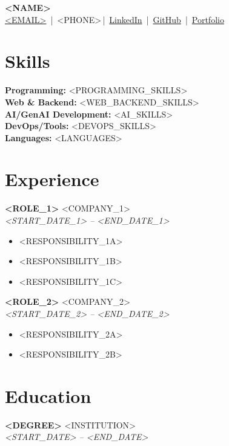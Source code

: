 \documentclass[a4paper,10pt]{article}
\newcommand{\Name}{<NAME>}
\newcommand{\Email}{<EMAIL>}
\newcommand{\Phone}{<PHONE>}
\newcommand{\LinkedIn}{<LINKEDIN>}
\newcommand{\GitHub}{<GITHUB>}
\newcommand{\Portfolio}{<PORTFOLIO>}
\begin{document}
\begin{center}
    {\LARGE \textbf{\Name}} \\
    \vspace{3pt}
    \href{mailto:\Email}{\Email} \,|\, \Phone \,|\, 
    \href{\LinkedIn}{LinkedIn} \,|\, 
    \href{\GitHub}{GitHub} \,|\, 
    \href{\Portfolio}{Portfolio}
\end{center}

\section*{Skills}
\textbf{Programming:} <PROGRAMMING_SKILLS> \\
\textbf{Web \& Backend:} <WEB_BACKEND_SKILLS> \\
\textbf{AI/GenAI Development:} <AI_SKILLS> \\
\textbf{DevOps/Tools:} <DEVOPS_SKILLS> \\
\textbf{Languages:} <LANGUAGES>

\section*{Experience}
\textbf{<ROLE_1>} \hfill <COMPANY_1> \\
\textit{<START_DATE_1> – <END_DATE_1>}
\begin{itemize}
    \item <RESPONSIBILITY_1A>
    \item <RESPONSIBILITY_1B>
    \item <RESPONSIBILITY_1C>
\end{itemize}

\textbf{<ROLE_2>} \hfill <COMPANY_2> \\
\textit{<START_DATE_2> – <END_DATE_2>}
\begin{itemize}
    \item <RESPONSIBILITY_2A>
    \item <RESPONSIBILITY_2B>
\end{itemize}

\section*{Education}
\textbf{<DEGREE>} \hfill <INSTITUTION> \\
\textit{<START_DATE> – <END_DATE>}

\end{document}
